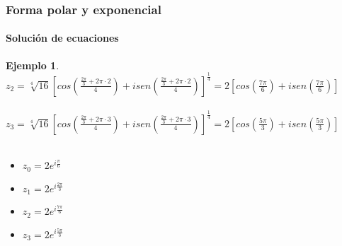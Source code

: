 \documentclass[11pt]{beamer}
\newtheorem{ejem}{Ejemplo}
\begin{document}
\begin{frame}
\frametitle{Forma polar y exponencial}
\framesubtitle{Solución de ecuaciones}
\begin{ejem}
$z_2 = \sqrt[4]{16}[cos(\frac{\frac{2\pi}{3}+2\pi \cdot 2}{4})+isen(\frac{\frac{2\pi}{3}+2\pi \cdot 2}{4})]^\frac{1}{4} = 
2[cos(\frac{7\pi}{6})+isen(\frac{7\pi}{6})]$\\ \hspace{0cm} \\
$z_3 = \sqrt[4]{16}[cos(\frac{\frac{2\pi}{3}+2\pi \cdot 3}{4})+isen(\frac{\frac{2\pi}{3}+2\pi \cdot 3}{4})]^\frac{1}{4} = 
2[cos(\frac{5\pi}{3})+isen(\frac{5\pi}{3})]$\\ \hspace{0cm} \\
\begin{itemize}
\item $z_0 = 2e^{i\frac{\pi}{6}}$
\item $z_1 = 2e^{i\frac{2\pi}{3}}$
\item $z_2 = 2e^{i\frac{7\pi}{6}}$
\item $z_3 = 2e^{i\frac{5\pi}{3}}$
\end{itemize}
\end{ejem}
\end{frame}
\end{document}
